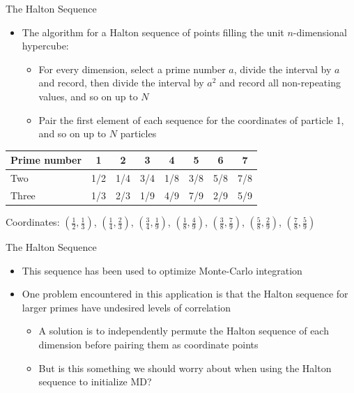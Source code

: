 \documentclass{beamer}
\begin{document}
	\begin{frame}{The Halton Sequence}
	\begin{itemize}
	\item The algorithm for a Halton sequence of points filling the unit $n$-dimensional hypercube: \vspace{0.5em}
	\begin{itemize}
	\item For every dimension, select a prime number $a$, divide the interval by $a$ and record, then divide the interval by $a^2$ and record all non-repeating values, and so on up to $N$
	\vspace{0.5em}
	
\item Pair the first element of each sequence for the coordinates of particle 1, and so on up to $N$ particles
	\end{itemize}
	
	\end{itemize}
\begin{center}	\begin{tabular}{|l|c|c|c|c|c|c|c|}\hline
	Prime number &1 &2&3&4&5&6&7\\\hline
	Two & 1/2 & 1/4 & 3/4 & 1/8 & 3/8 & 5/8 & 7/8\\ \hline
	Three & 1/3 & 2/3 & 1/9 & 4/9 & 7/9 & 2/9 & 5/9\\ \hline
	\end{tabular}\end{center}
	Coordinates: $\left(\frac{1}{2},\frac{1}{3}\right)$, $\left(\frac{1}{4},\frac{2}{3}\right)$, $\left(\frac{3}{4},\frac{1}{9}\right)$, $\left(\frac{1}{8},\frac{4}{9}\right)$, $\left(\frac{3}{8},\frac{7}{9}\right)$, $\left(\frac{5}{8},\frac{2}{9}\right)$, $\left(\frac{7}{8},\frac{5}{9}\right)$
	\end{frame}
	
	
	\begin{frame}{The Halton Sequence}
	\begin{itemize}
	\item This sequence has been used to optimize Monte-Carlo integration\vspace{0.5em}
	\item One problem encountered in this application is that the Halton sequence for larger primes have undesired levels of correlation\vspace{0.5em}
	\begin{itemize}
	\item A solution is to independently permute the Halton sequence of each dimension before pairing them as coordinate points
	\vspace{0.5em}
	
\item But is this something we should worry about when using the Halton sequence to initialize MD?\vspace{0.5em}
	\end{itemize}
	\end{itemize}
	
	\end{frame}
	
\end{document}

